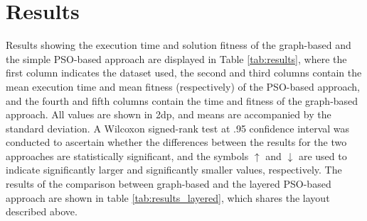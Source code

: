 \documentclass{llncs}
\begin{document}
\section{Results}\label{results}

Results showing the execution time and solution fitness of the graph-based and the simple PSO-based approach are displayed in Table \ref{tab:results}, where the first column indicates the dataset used, the second and third columns contain the mean execution time and mean fitness (respectively) of the PSO-based approach, and the fourth and fifth columns contain the time and fitness of the graph-based approach. All values are shown in 2dp, and means are accompanied by the standard deviation. A Wilcoxon signed-rank test at .95 confidence interval was conducted to ascertain whether the differences between the results for the two approaches are statistically significant, and the symbols $\uparrow$ and $\downarrow$ are used to indicate significantly larger and significantly smaller values, respectively. The results of the comparison between graph-based and the layered PSO-based approach are shown in table \ref{tab:results_layered}, which shares the layout described above.
\end{document}
